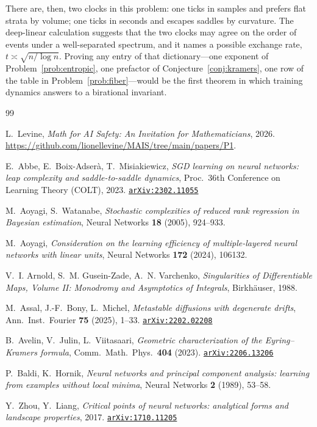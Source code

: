 \documentclass[11pt]{amsart}
\newcommand{\arxiv}[1]{\href{https://arxiv.org/abs/#1}{\texttt{arXiv:#1}}}
\theoremstyle{plain}
\theoremstyle{definition}
\begin{document}
There are, then, two clocks in this problem: one ticks in samples and prefers flat strata by volume; one ticks in seconds and escapes saddles by curvature. The deep-linear calculation suggests that the two clocks may agree on the order of events under a well-separated spectrum, and it names a possible exchange rate, $t \asymp \sqrt{n / \log n}$. Proving any entry of that dictionary---one exponent of Problem~\ref{prob:entropic}, one prefactor of Conjecture~\ref{conj:kramers}, one row of the table in Problem~\ref{prob:fiber}---would be the first theorem in which training dynamics answers to a birational invariant.

\begin{thebibliography}{99}

L.~Levine,
\emph{Math for AI Safety: An Invitation for Mathematicians},
2026. \url{https://github.com/lionellevine/MAIS/tree/main/papers/P1}.


E.~Abbe, E.~Boix-Adser\`a, T.~Misiakiewicz,
\emph{SGD learning on neural networks: leap complexity and saddle-to-saddle dynamics},
Proc.\ 36th Conference on Learning Theory (COLT), 2023.
\arxiv{2302.11055}

M.~Aoyagi, S.~Watanabe,
\emph{Stochastic complexities of reduced rank regression in Bayesian estimation},
Neural Networks \textbf{18} (2005), 924--933.

M.~Aoyagi,
\emph{Consideration on the learning efficiency of multiple-layered neural networks with linear units},
Neural Networks \textbf{172} (2024), 106132.

V.~I. Arnold, S.~M. Gusein-Zade, A.~N. Varchenko,
\emph{Singularities of Differentiable Maps, Volume II: Monodromy and Asymptotics of Integrals},
Birkh\"auser, 1988.

M.~Assal, J.-F.~Bony, L.~Michel,
\emph{Metastable diffusions with degenerate drifts},
Ann.\ Inst.\ Fourier \textbf{75} (2025), 1--33.
\arxiv{2202.02208}

B.~Avelin, V.~Julin, L.~Viitasaari,
\emph{Geometric characterization of the Eyring--Kramers formula},
Comm.\ Math.\ Phys.\ \textbf{404} (2023).
\arxiv{2206.13206}

P.~Baldi, K.~Hornik,
\emph{Neural networks and principal component analysis: learning from examples without local minima},
Neural Networks \textbf{2} (1989), 53--58.

Y.~Zhou, Y.~Liang,
\emph{Critical points of neural networks: analytical forms and landscape properties},
2017. \arxiv{1710.11205}


\end{thebibliography}
\end{document}
